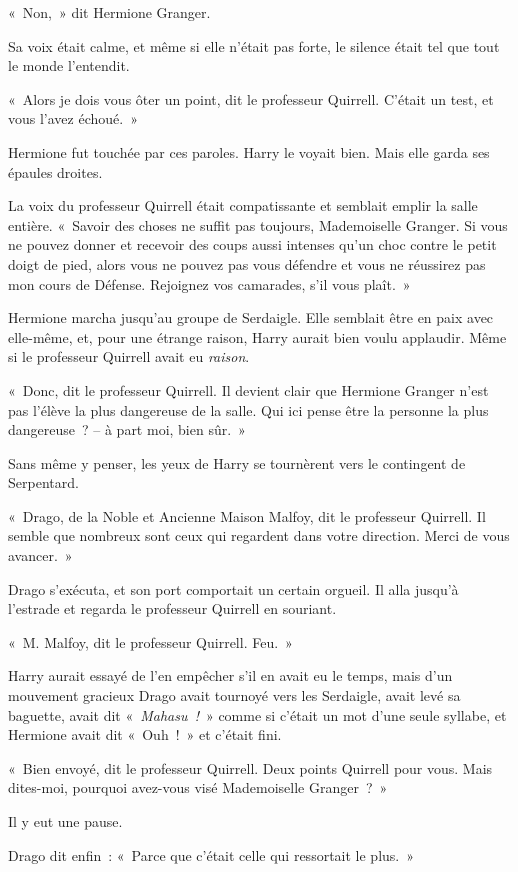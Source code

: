 «~Non,~» dit Hermione Granger.

Sa voix était calme, et même si elle n'était pas forte, le silence était tel que tout le monde l'entendit.

«~Alors je dois vous ôter un point, dit le professeur Quirrell. C'était un test, et vous l'avez échoué.~»

Hermione fut touchée par ces paroles. Harry le voyait bien. Mais elle garda ses épaules droites.

La voix du professeur Quirrell était compatissante et semblait emplir la salle entière. «~Savoir des choses ne suffit pas toujours, Mademoiselle Granger. Si vous ne pouvez donner et recevoir des coups aussi intenses qu'un choc contre le petit doigt de pied, alors vous ne pouvez pas vous défendre et vous ne réussirez pas mon cours de Défense. Rejoignez vos camarades, s'il vous plaît.~»

Hermione marcha jusqu'au groupe de Serdaigle. Elle semblait être en paix avec elle-même, et, pour une étrange raison, Harry aurait bien voulu applaudir. Même si le professeur Quirrell avait eu \emph{raison}.

«~Donc, dit le professeur Quirrell. Il devient clair que Hermione Granger n'est pas l'élève la plus dangereuse de la salle. Qui ici pense être la personne la plus dangereuse~? -- à part moi, bien sûr.~»

Sans même y penser, les yeux de Harry se tournèrent vers le contingent de Serpentard.

«~Drago, de la Noble et Ancienne Maison Malfoy, dit le professeur Quirrell. Il semble que nombreux sont ceux qui regardent dans votre direction. Merci de vous avancer.~»

Drago s'exécuta, et son port comportait un certain orgueil. Il alla jusqu'à l'estrade et regarda le professeur Quirrell en souriant.

«~M. Malfoy, dit le professeur Quirrell. Feu.~»

Harry aurait essayé de l'en empêcher s'il en avait eu le temps, mais d'un mouvement gracieux Drago avait tournoyé vers les Serdaigle, avait levé sa baguette, avait dit «~\emph{Mahasu~!}~» comme si c'était un mot d'une seule syllabe, et Hermione avait dit «~Ouh~!~» et c'était fini.

«~Bien envoyé, dit le professeur Quirrell. Deux points Quirrell pour vous. Mais dites-moi, pourquoi avez-vous visé Mademoiselle Granger~?~»

Il y eut une pause.

Drago dit enfin~: «~Parce que c'était celle qui ressortait le plus.~»


